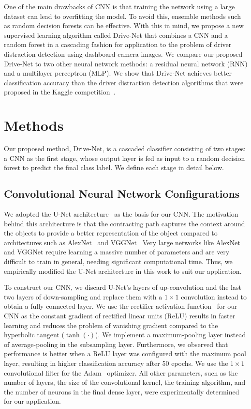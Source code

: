 One of the main drawbacks of CNN is that training the network using a large dataset can lead to overfitting the model. To avoid this, ensemble methods such as random decision forests can be effective. With this in mind, we propose a new supervised learning algorithm called Drive-Net that combines a CNN and a random forest in a cascading fashion for application to the problem of driver distraction detection using dashboard camera images. We compare our proposed Drive-Net to two other neural network methods: a residual neural network (RNN) and a multilayer perceptron (MLP). We show that Drive-Net achieves better classification accuracy than the driver distraction detection algorithms that were proposed in the Kaggle competition~\cite{montoya_State_2016}.
\pagebreak

\section{Methods}
Our proposed method, Drive-Net, is a cascaded classifier consisting of two stages: a CNN as the first stage, whose output layer is fed as input to a random decision forest to predict the final class label. We define each stage in detail below.

\subsection{Convolutional Neural Network Configurations}
We adopted the U-Net architecture~\cite{ronneberger_UNet_2015} as the basis for our CNN\@. The motivation behind this architecture is that the contracting path captures the context around the objects to provide a better representation of the object compared to architectures such as AlexNet~\cite{krizhevsky_One_2014} and VGGNet~\cite{simonyan_Very_2014} Very large networks like AlexNet and VGGNet require learning a massive number of parameters and are very difficult to train in general, needing significant computational time. Thus, we empirically modified the U-Net architecture in this work to suit our application.

To construct our CNN, we discard U-Net's layers of up-convolution and the last two layers of down-sampling and replace them with a $1\times1 $ convolution instead to obtain a fully connected layer. We use the rectifier activation function~\cite{simonyan_Very_2014} for our CNN as the constant gradient of rectified linear units (ReLU) results in faster learning and reduces the problem of vanishing gradient compared to the hyperbolic tangent (${\tanh{(\cdot)}} $). We implement a maximum-pooling layer instead of average-pooling in the subsampling layer. Furthermore, we observed that performance is better when a ReLU layer was configured with the maximum pool layer, resulting in higher classification accuracy after 50 epochs. We use the $1\times1 $ convolutional filter for the Adam~\cite{kingma_Adam_2014} optimizer. All other parameters, such as the number of layers, the size of the convolutional kernel, the training algorithm, and the number of neurons in the final dense layer, were experimentally determined for our application.

